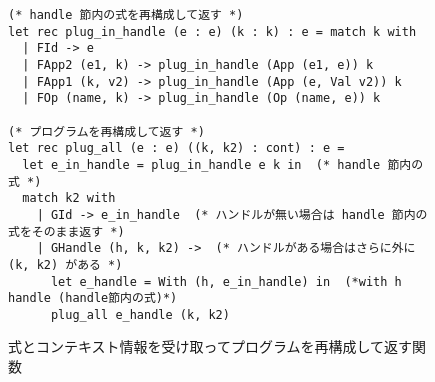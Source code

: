 \begin{figure}
\begin{spacing}{0.9}
\begin{verbatim}
(* handle 節内の式を再構成して返す *)
let rec plug_in_handle (e : e) (k : k) : e = match k with
  | FId -> e
  | FApp2 (e1, k) -> plug_in_handle (App (e1, e)) k
  | FApp1 (k, v2) -> plug_in_handle (App (e, Val v2)) k
  | FOp (name, k) -> plug_in_handle (Op (name, e)) k

(* プログラムを再構成して返す *)
let rec plug_all (e : e) ((k, k2) : cont) : e =
  let e_in_handle = plug_in_handle e k in  (* handle 節内の式 *)
  match k2 with
    | GId -> e_in_handle  (* ハンドルが無い場合は handle 節内の式をそのまま返す *)
    | GHandle (h, k, k2) ->  (* ハンドルがある場合はさらに外に (k, k2) がある *)
      let e_handle = With (h, e_in_handle) in  (*with h handle (handle節内の式)*)
      plug_all e_handle (k, k2)
\end{verbatim}
\caption{式とコンテキスト情報を受け取ってプログラムを再構成して返す関数}
\label{figure:plug_all}
\end{spacing}
\end{figure}

